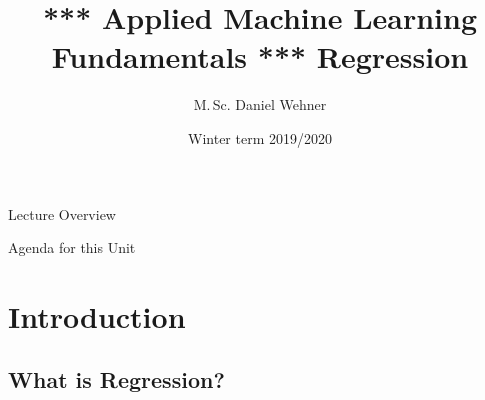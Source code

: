 


\title[Regression]{*** Applied Machine Learning Fundamentals *** Regression}
\author{M.\,Sc. Daniel Wehner}
\date{Winter term 2019/2020}




\maketitlepage


\begin{frame}{Lecture Overview}{}
\end{frame}


\begin{frame}{Agenda for this Unit}
	\begin{multicols}{2}
		\tableofcontents
	\end{multicols}
\end{frame}


\section{Introduction}

\subsection{What is Regression?}

